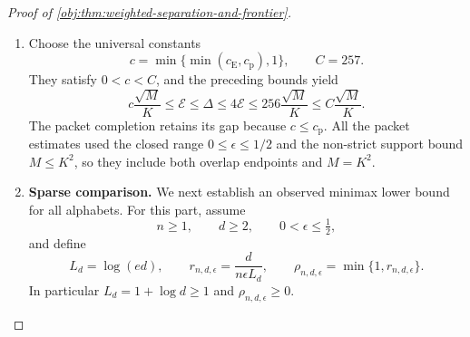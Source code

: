 \documentclass[11pt]{article}
\begin{document}
\begin{proof}[Proof of \cref{obj:thm:weighted-separation-and-frontier}]
\begin{enumerate}
Set
\[
N_{\mathrm{up}}=\lfloor K/2\rfloor+1,
\qquad
T_{\mathrm{up}}(\omega)
=\int_{-\pi}^{\pi}
f_{M,\epsilon}(\omega+\upsilon)
J_{N_{\mathrm{up}}}^{\mathrm J}(\upsilon)\,d\upsilon.
\]
Convolution with the even Jackson kernel makes \(T_{\mathrm{up}}\) an even trigonometric polynomial of degree at most
\(2(N_{\mathrm{up}}-1)\le K\). Positivity, normalization, and the first kernel moment give
\[
|f_{M,\epsilon}(\omega)-T_{\mathrm{up}}(\omega)|
\le
\sqrt M\int_{-\pi}^{\pi}
|\upsilon|J_{N_{\mathrm{up}}}^{\mathrm J}(\upsilon)\,d\upsilon
\le\frac{32\sqrt M}{N_{\mathrm{up}}}.
\]
Writing its cosine modes as Chebyshev polynomials supplies a real polynomial \(Q_{\mathrm{up}}\) such that
\[
T_{\mathrm{up}}(\omega)=Q_{\mathrm{up}}(\cos\omega),
\qquad
\deg Q_{\mathrm{up}}\le2(N_{\mathrm{up}}-1).
\]
Define
\[
P_{\mathrm{up}}(z)
=\epsilon(z-1)+Q_{\mathrm{up}}(2z/M-1).
\]
Then \(\deg P_{\mathrm{up}}\le K\), and every \(z\in[0,M]\) can be written as
\(z_M(\omega)\). Since \(K\le2N_{\mathrm{up}}\),
\[
|\phi_\epsilon(z)-P_{\mathrm{up}}(z)|
\le\frac{32\sqrt M}{N_{\mathrm{up}}}
\le\frac{64\sqrt M}{K}.
\]
Division by \(1+z\ge1\), followed by the polynomial infimum, proves
\[
\mathcal E\le\frac{64\sqrt M}{K}.
\]

\item
Choose the universal constants
\[
c=\min\{\min(c_{\mathrm E},c_{\mathrm p}),1\},
\qquad
C=257.
\]
They satisfy \(0<c<C\), and the preceding bounds yield
\[
c\frac{\sqrt M}{K}
\le\mathcal E
\le\Delta
\le4\mathcal E
\le256\frac{\sqrt M}{K}
\le C\frac{\sqrt M}{K}.
\]
The packet completion retains its gap because \(c\le c_{\mathrm p}\).
All the packet estimates used the closed range
\(0\le\epsilon\le1/2\) and the non-strict support bound \(M\le K^2\), so they include both overlap endpoints and \(M=K^2\).

\item
\textbf{Sparse comparison.}\quad
We next establish an observed minimax lower bound for all alphabets. For this part, assume
\[
n\ge1,\qquad d\ge2,\qquad 0<\epsilon\le\tfrac12,
\]
and define
\[
L_d=\log(ed),
\qquad
r_{n,d,\epsilon}=\frac{d}{n\epsilon L_d},
\qquad
\rho_{n,d,\epsilon}=\min\{1,r_{n,d,\epsilon}\}.
\]
In particular \(L_d=1+\log d\ge1\) and \(\rho_{n,d,\epsilon}\ge0\).


\end{enumerate}
\end{proof}
\end{document}
